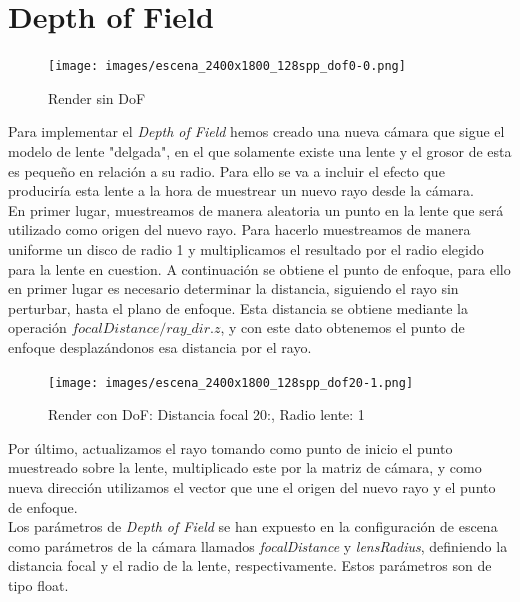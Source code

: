 \documentclass[10pt,oneside,a4paper]{article}
\begin{document}
\section{Depth of Field}

\begin{figure}[h]
\centering
\texttt{[image: images/escena\_2400x1800\_128spp\_dof0-0.png]}
\caption{Render sin DoF}
\label{fig:disp}
\end{figure}

Para implementar el \textit{Depth of Field} hemos creado una nueva cámara que sigue el modelo de lente "delgada", en el que solamente existe una lente y el grosor de esta es pequeño en relación a su radio. Para ello se va a incluir el efecto que produciría esta lente a la hora de muestrear un nuevo rayo desde la cámara.\\

En primer lugar, muestreamos de manera aleatoria un punto en la lente que será utilizado como origen del nuevo rayo. Para hacerlo muestreamos de manera uniforme un disco de radio 1 y multiplicamos el resultado por el radio elegido para la lente en cuestion. A continuación se obtiene el punto de enfoque, para ello en primer lugar es necesario determinar la distancia, siguiendo el rayo sin perturbar, hasta el plano de enfoque. Esta distancia se obtiene mediante la operación $focalDistance/ ray\_dir.z$, y con este dato obtenemos el punto de enfoque desplazándonos esa distancia por el rayo.\\

\begin{figure}[h]
\centering
\texttt{[image: images/escena\_2400x1800\_128spp\_dof20-1.png]}
\caption{Render con DoF: Distancia focal 20:, Radio lente: 1}
\label{fig:disp}
\end{figure}

Por último, actualizamos el rayo tomando como punto de inicio el punto muestreado sobre la lente, multiplicado este por la matriz de cámara, y como nueva dirección utilizamos el vector que une el origen del nuevo rayo y el punto de enfoque.\\

Los parámetros de \emph{Depth of Field} se han expuesto en la configuración de escena como parámetros de la cámara llamados \emph{focalDistance} y \emph{lensRadius}, definiendo la distancia focal y el radio de la lente, respectivamente. Estos parámetros son de tipo float.
\end{document}
